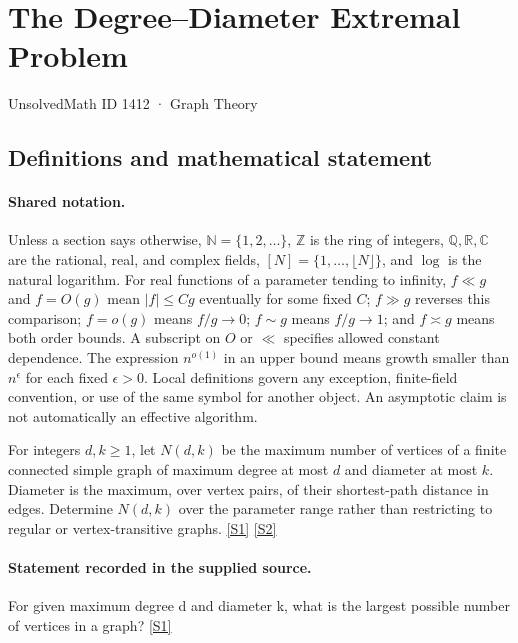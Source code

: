 \documentclass[11pt,a4paper]{article}
\newcommand{\N}{\mathbb{N}}
\newcommand{\Z}{\mathbb{Z}}
\newcommand{\Q}{\mathbb{Q}}
\newcommand{\R}{\mathbb{R}}
\newcommand{\C}{\mathbb{C}}
\newcommand{\sref}[2]{\hyperlink{source:#1:#2}{[S#2]}}
\begin{document}

\setcounter{section}{1411}

\section{The Degree--Diameter Extremal Problem}\label{1412}

{\small\sffamily UnsolvedMath ID 1412 · Graph Theory}

\subsection{Definitions and mathematical statement}

\paragraph{Shared notation.}Unless a section says otherwise, $\N=\{1,2,\ldots\}$,
$\Z$ is the ring of integers, $\Q,\R,\C$ are the rational, real, and complex
fields, $[N]=\{1,\ldots,\lfloor N\rfloor\}$, and $\log$ is the natural
logarithm. For real functions of a parameter tending to infinity,
$f\ll g$ and $f=O(g)$ mean $|f|\leq Cg$ eventually for some fixed $C$;
$f\gg g$ reverses this comparison; $f=o(g)$ means $f/g\to0$;
$f\sim g$ means $f/g\to1$; and $f\asymp g$ means both order bounds.
A subscript on $O$ or $\ll$ specifies allowed constant dependence.
The expression $n^{o(1)}$ in an upper bound means growth smaller than
$n^\epsilon$ for each fixed $\epsilon>0$. Local definitions govern any
exception, finite-field convention, or use of the same symbol for another
object. An asymptotic claim is not automatically an effective algorithm.



For integers $d,k\geq1$, let $N(d,k)$ be the maximum number of vertices of a finite connected simple graph of maximum degree at most $d$ and diameter at most $k$. Diameter is the maximum, over vertex pairs, of their shortest-path distance in edges. Determine $N(d,k)$ over the parameter range rather than restricting to regular or vertex-transitive graphs. \sref{1412}{1} \sref{1412}{2}

\paragraph{Statement recorded in the supplied source.}
For given maximum degree d and diameter k, what is the largest possible number of vertices in a graph? \sref{1412}{1}
\end{document}
